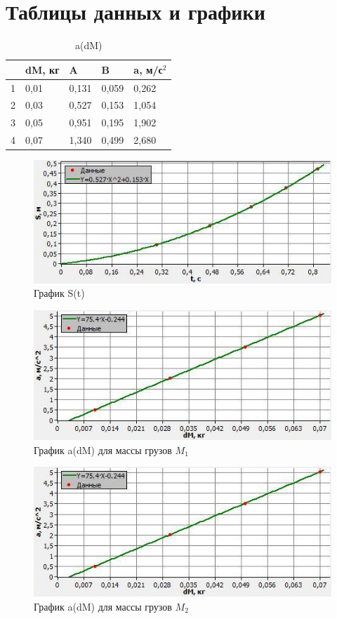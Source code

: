 \documentclass[12pt]{article}
\begin{document}
	\section{Таблицы данных и графики}
	\begin{table}[h]
	\begin{tabular}{|l|l|l|l|l|}
		\hline
		& dM, кг & A     & B     & a, м/с$^2$ \\ \hline
		1 & 0,01   & 0,131 & 0,059 & 0,262      \\ \hline
		2 & 0,03   & 0,527 & 0,153 & 1,054      \\ \hline
		3 & 0,05   & 0,951 & 0,195 & 1,902      \\ \hline
		4 & 0,07   & 1,340 & 0,499 & 2,680      \\ \hline
	\end{tabular}
	\caption{a(dM)}
	\end{table}
	\begin{figure}[h]
		\centering
		\includegraphics[scale=1.2]{graph1}
		\caption{График S(t)}
	\end{figure}
	\begin{figure}[h!]
		\includegraphics[scale=1.2]{graph2}
		\caption{График a(dM) для массы грузов $M_1$}
	\end{figure}
	\begin{figure}[h!]
		\includegraphics[scale=1.2]{graph3}
		\caption{График a(dM) для массы грузов $M_2$}
	\end{figure}
	\newpage
\end{document}
